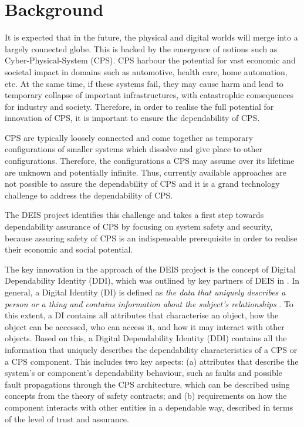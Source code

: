 \section{Background}
It is expected that in the future, the physical and digital worlds will merge into a largely connected globe. This is backed by the emergence of notions such as Cyber-Physical-System (CPS). 
CPS harbour the potential for vast economic and societal impact in domains such as automotive, health care, home automation, etc. At the same time, if these systems fail, they may cause harm and lead to temporary collapse of important infrastructures, with catastrophic consequences for industry and society. 
Therefore, in order to realise the full potential for innovation of CPS, it is important to ensure the dependability of CPS.

CPS are typically loosely connected and come together as temporary configurations of smaller systems which dissolve and give place to other configurations. Therefore, the configurations a CPS may assume over its lifetime are unknown and potentially infinite. Thus, currently available approaches are not possible to assure the dependability of CPS and it is a grand technology challenge to address the dependability of CPS. 

The DEIS project identifies this challenge and takes a first step towards dependability assurance of CPS by focusing on system safety and security, because assuring safety of CPS is an indispensable prerequisite in order to realise their economic and social potential.

The key innovation in the approach of the DEIS project is the concept of Digital Dependability Identity (DDI), which was outlined by key partners of DEIS in \cite{Schneider2015}. 
In general, a Digital Identity (DI) is defined as \emph{the data that uniquely describes a person or a thing and contains information about the subject's relationships} \cite{windley2005digital}. 
To this extent, a DI contains all attributes that characterise an object, how the object can be accessed, who can access it, and how it may interact with other objects. Based on this, a Digital Dependability Identity (DDI) contains all the information that uniquely describes the dependability characteristics of a CPS or a CPS component. This includes two key aspects: (a) attributes that describe the system’s or component’s dependability behaviour, such as faults and possible fault propagations through the CPS architecture, which can be described using concepts from the theory of safety contracts; and (b) requirements on how the component interacts with other entities in a dependable way, described in terms of the level of trust and assurance.

